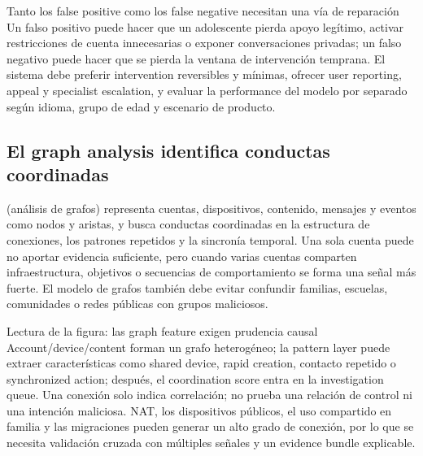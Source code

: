 \begin{warningbox}{Tanto los false positive como los false negative necesitan una vía de reparación}
Un falso positivo puede hacer que un adolescente pierda apoyo legítimo, activar restricciones de cuenta innecesarias o exponer conversaciones privadas; un falso negativo puede hacer que se pierda la ventana de intervención temprana. El sistema debe preferir intervention reversibles y mínimas, ofrecer user reporting, appeal y specialist escalation, y evaluar la performance del modelo por separado según idioma, grupo de edad y escenario de producto.
\end{warningbox}


\subsection{El graph analysis identifica conductas coordinadas}

 (análisis de grafos) representa cuentas, dispositivos, contenido, mensajes y eventos como nodos y aristas, y busca conductas coordinadas en la estructura de conexiones, los patrones repetidos y la sincronía temporal. Una sola cuenta puede no aportar evidencia suficiente, pero cuando varias cuentas comparten infraestructura, objetivos o secuencias de comportamiento se forma una señal más fuerte. El modelo de grafos también debe evitar confundir familias, escuelas, comunidades o redes públicas con grupos maliciosos.


\begin{knowledgebox}{Lectura de la figura: las graph feature exigen prudencia causal}
Account/device/content forman un grafo heterogéneo; la pattern layer puede extraer características como shared device, rapid creation, contacto repetido o synchronized action; después, el coordination score entra en la investigation queue. Una conexión solo indica correlación; no prueba una relación de control ni una intención maliciosa. NAT, los dispositivos públicos, el uso compartido en familia y las migraciones pueden generar un alto grado de conexión, por lo que se necesita validación cruzada con múltiples señales y un evidence bundle explicable.
\end{knowledgebox}

